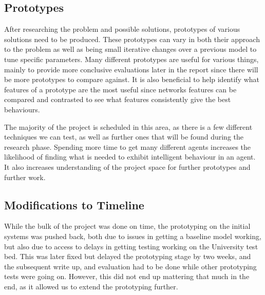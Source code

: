 \subsection{Prototypes}

After researching the problem and possible solutions, prototypes of various
solutions need to be produced. These prototypes can vary in both their approach
to the problem as well as being small iterative changes over a previous model
to tune specific parameters. Many different prototypes are useful for
various things, mainly to provide more conclusive evaluations later in the report
since there will be more prototypes to compare against. It is also beneficial to
help identify what features of a prototype are the most useful since networks
features can be compared and contrasted to see what features consistently give the
best behaviours.

The majority of the project is scheduled in this area, as there is a few
different techniques we can test, as well as further ones that will be found
during the research phase. Spending more time to get many different agents
increases the likelihood of finding what is needed to exhibit intelligent
behaviour in an agent. It also increases understanding of the project space for
further prototypes and further work.

\subsection{Modifications to Timeline}

While the bulk of the project was done on time, the prototyping on the initial
systems was pushed back, both due to issues in getting a baseline model working,
but also due to access to delays in getting testing working on the University
test bed. This was later fixed but delayed the prototyping stage by two weeks,
and the subsequent write up, and evaluation had to be done while other
prototyping tests were going on. However, this did not end up mattering that
much in the end, as it allowed us to extend the prototyping further.
